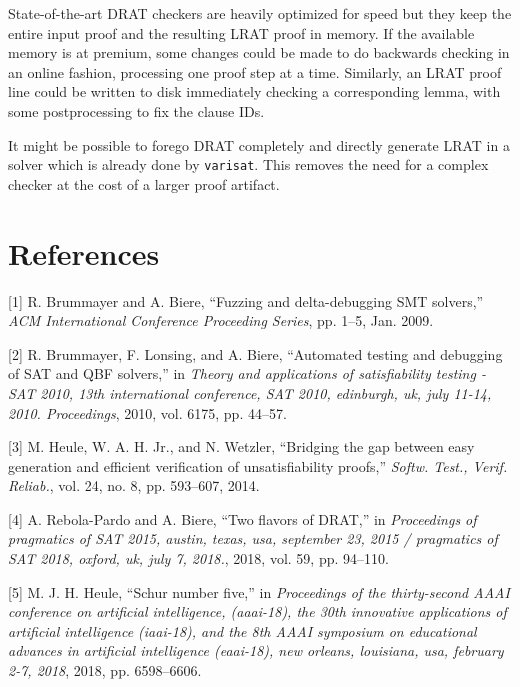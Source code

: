 \documentclass[
]{report}
\begin{document}
State-of-the-art DRAT checkers are heavily optimized for speed but they
keep the entire input proof and the resulting LRAT proof in memory. If
the available memory is at premium, some changes could be made to do
backwards checking in an online fashion, processing one proof step at a
time. Similarly, an LRAT proof line could be written to disk immediately
checking a corresponding lemma, with some postprocessing to fix the
clause IDs.

It might be possible to forego DRAT completely and directly generate
LRAT in a solver which is already done by \texttt{varisat}. This removes
the need for a complex checker at the cost of a larger proof artifact.

\hypertarget{references}{%
\chapter*{References}\label{references}}

\hypertarget{refs}{}
\leavevmode\hypertarget{ref-BrummayerBiere-SMT09}{}%
{[}1{]} R. Brummayer and A. Biere, ``Fuzzing and delta-debugging SMT
solvers,'' \emph{ACM International Conference Proceeding Series}, pp.
1--5, Jan. 2009.

\leavevmode\hypertarget{ref-DBLP:confux2fsatux2fBrummayerLB10}{}%
{[}2{]} R. Brummayer, F. Lonsing, and A. Biere, ``Automated testing and
debugging of SAT and QBF solvers,'' in \emph{Theory and applications of
satisfiability testing - SAT 2010, 13th international conference, SAT
2010, edinburgh, uk, july 11-14, 2010. Proceedings}, 2010, vol. 6175,
pp. 44--57.

\leavevmode\hypertarget{ref-DBLP:journalsux2fstvrux2fHeuleHW14}{}%
{[}3{]} M. Heule, W. A. H. Jr., and N. Wetzler, ``Bridging the gap
between easy generation and efficient verification of unsatisfiability
proofs,'' \emph{Softw. Test., Verif. Reliab.}, vol. 24, no. 8, pp.
593--607, 2014.

\leavevmode\hypertarget{ref-DBLP:confux2fsatux2fRebola-PardoB18}{}%
{[}4{]} A. Rebola-Pardo and A. Biere, ``Two flavors of DRAT,'' in
\emph{Proceedings of pragmatics of SAT 2015, austin, texas, usa,
september 23, 2015 / pragmatics of SAT 2018, oxford, uk, july 7, 2018.},
2018, vol. 59, pp. 94--110.

\leavevmode\hypertarget{ref-DBLP:confux2faaaiux2fHeule18}{}%
{[}5{]} M. J. H. Heule, ``Schur number five,'' in \emph{Proceedings of
the thirty-second AAAI conference on artificial intelligence, (aaai-18),
the 30th innovative applications of artificial intelligence (iaai-18),
and the 8th AAAI symposium on educational advances in artificial
intelligence (eaai-18), new orleans, louisiana, usa, february 2-7,
2018}, 2018, pp. 6598--6606.
\end{document}
